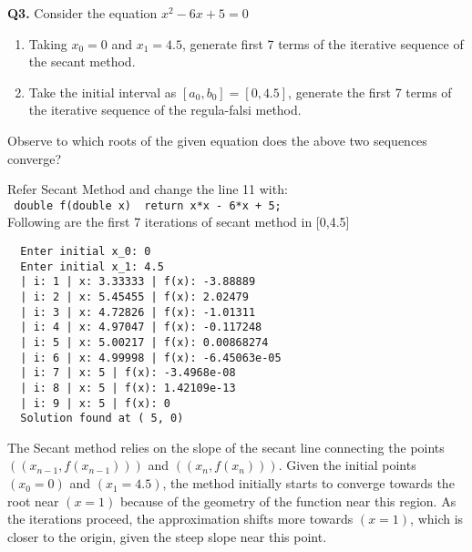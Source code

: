 \documentclass[a4paper]{article}
\begin{document}
\textbf{Q3.}
Consider the equation $x^2 - 6x + 5 = 0$
\begin{enumerate}
	\item Taking $x_0 = 0$ and $x_1 = 4.5$, generate first 7 terms of the iterative sequence of the secant
	      method.
	\item Take the initial interval as $[a_0, b_0] = [0, 4.5]$, generate the first 7 terms of the iterative
	      sequence of the regula-falsi method.
\end{enumerate}
Observe to which roots of the given equation does the above two sequences converge?

\begin{answer}
	Refer Secant Method and change the line 11 with: \\
	\texttt{ double f(double x) { return x*x - 6*x + 5; }} \\

	Following are the first 7 iterations of secant method in [0,4.5]
	\begin{verbatim}
  Enter initial x_0: 0
  Enter initial x_1: 4.5
  | i: 1 | x: 3.33333 | f(x): -3.88889
  | i: 2 | x: 5.45455 | f(x): 2.02479
  | i: 3 | x: 4.72826 | f(x): -1.01311
  | i: 4 | x: 4.97047 | f(x): -0.117248
  | i: 5 | x: 5.00217 | f(x): 0.00868274
  | i: 6 | x: 4.99998 | f(x): -6.45063e-05
  | i: 7 | x: 5 | f(x): -3.4968e-08
  | i: 8 | x: 5 | f(x): 1.42109e-13
  | i: 9 | x: 5 | f(x): 0
  Solution found at ( 5, 0)
\end{verbatim}
	The Secant method relies on the slope of the secant line connecting the points $( (x_{n-1}, f(x_{n-1})) )$ and
	$( (x_n, f(x_n)) )$. Given the initial points $( x_0 = 0 )$ and $( x_1 = 4.5 )$, the method initially starts
	to converge towards the root near $( x = 1 )$ because of the geometry of the function near this region. As the
	iterations proceed, the approximation shifts more towards $( x = 1 )$, which is closer to the origin, given the
	steep slope near this point.
\end{answer}
\end{document}
